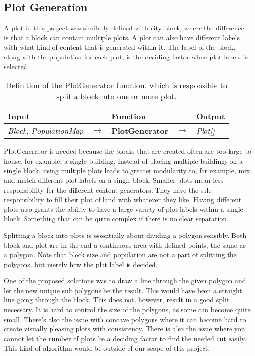 \subsection{Plot Generation}  
A plot in this project was similarly defined with city block, where the difference is that a block can contain multiple plots. 
A plot can also have different labels with what kind of content that is generated within it. 
The label of the block, along with the population for each plot, is the deciding factor when plot labels is selected. 

\begin{table}[H]
    \centering
    \begin{tabular}{lllll}
      \textbf{Input}                           &               & \textbf{Function}            &               & \textbf{Output}         \\
      \midrule
      \textit{Block, PopulationMap}            & $\rightarrow$ & \textbf{PlotGenerator}       & $\rightarrow$ & \textit{Plot[]}         \\
      \bottomrule
    \end{tabular}

    \caption{Definition of the PlotGenerator function, which is responsible to split a block into one or more plot.}
    \label{table:plotgen}
  \end{table}
  \vspace{-0.4cm} 

PlotGenerator is needed because the blocks that are created often are too large to house, for example, a single building.
Instead of placing multiple buildings on a single block, using multiple plots leads to greater modularity to, for example, mix and match different plot labels on a single block.
Smaller plots mean less responsibility for the different content generators. 
They have the sole responsibility to fill their plot of land with whatever they like. 
Having different plots also grants the ability to have a large variety of plot labels within a single block. 
Something that can be quite complex if there is no clear separation.

Splitting a block into plots is essentially about dividing a polygon sensibly. 
Both block and plot are in the end a continuous area with defined points, the same as a polygon. 
Note that block size and population are not a part of splitting the polygons, but merely how the plot label is decided. 

One of the proposed solutions was to draw a line through the given polygon and let the new unique sub polygons be the result. 
This would have been a straight line going through the block. 
This does not, however, result in a good split necessary. 
It is hard to control the size of the polygons, as some can become quite small. 
There’s also the issue with concave polygons where it can become hard to create visually pleasing plots with consistency. 
There is also the issue where you cannot let the number of plots be a deciding factor to find the needed cut easily. 
This kind of algorithm would be outside of our scope of this project. 

